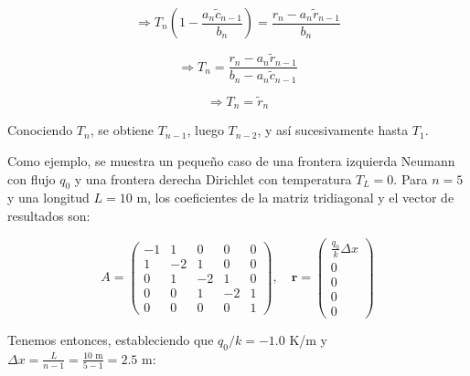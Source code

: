 \documentclass[11pt,a4paper]{article}
\begin{document}
\begin{equation}
\Rightarrow T_n \left(1 - \frac{a_n \tilde{c}_{n-1}}{b_n}\right) 
= \frac{r_n - a_n \tilde{r}_{n-1}}{b_n}
\end{equation}

\begin{equation}
\Rightarrow T_n = \frac{r_n - a_n \tilde{r}_{n-1}}{b_n - a_n \tilde{c}_{n-1}}
\end{equation}

\begin{equation}
\Rightarrow T_n = \tilde{r}_n
\label{eq:tri_solve_last_final}
\end{equation}

Conociendo $T_n$, se obtiene $T_{n-1}$, luego $T_{n-2}$, y as\'i sucesivamente 
hasta $T_1$.

\medskip

Como ejemplo, se muestra un peque\~no caso de una frontera izquierda Neumann 
con flujo $q_0$ y una frontera derecha Dirichlet con temperatura $T_L = 0$. 
Para $n = 5$ y una longitud $L = 10 \text{ m}$, los coeficientes de la matriz tridiagonal y el vector de 
resultados son:

\begin{equation}
A = \begin{pmatrix}
  -1 & 1 & 0 & 0 & 0 \\
  1 & -2 & 1 & 0 & 0 \\
  0 & 1 & -2 & 1 & 0 \\
  0 & 0 & 1 & -2 & 1 \\
  0 & 0 & 0 & 0 & 1
\end{pmatrix}, \quad
\mathbf{r} = \begin{pmatrix}
\frac{q_0}{k} \Delta x\\
0 \\
0 \\
0 \\
0
\end{pmatrix}
\end{equation}

Tenemos entonces, estableciendo que $q_0/k = -1\textrm{.}0$ K/m y 
$\Delta x = \frac{L}{n - 1} = \frac{10 \text{ m}}{5 - 1} = 2\textrm{.}5 \text{ m}$:
\end{document}
